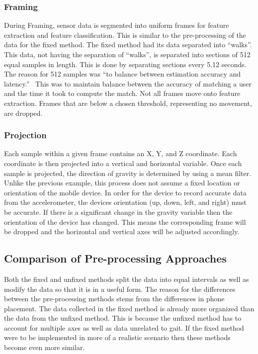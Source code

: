 \documentclass{sig-alternate}
\begin{document}
		
			
\subsubsection{Framing}{
 During Framing, sensor data is segmented into uniform frames for feature extraction and feature classification. This is similar to the pre-processing of the data for the fixed method. The fixed method had its data separated into ``walks''. This data, not having the separation of ``walks'', is separated into sections of 512 equal samples in length. This is done by separating sections every 5.12 seconds. The reason for 512 samples was ``to balance between estimation accuracy and latency.''~\cite{Lu:2014} This was to maintain balance between the accuracy of matching a user and the time it took to compute the match. Not all frames move onto feature extraction. Frames that are below a chosen threshold, representing no movement, are dropped. }
 			
\subsubsection{Projection}{
	Each sample within a given frame contains an X, Y, and Z coordinate. Each coordinate is then projected into a vertical and horizontal variable. Once each sample is projected, the direction of gravity is determined by using a mean filter. Unlike the previous example, this process does not assume a fixed location or orientation of the mobile device. In order for the device to record accurate data from the accelerometer, the devices orientation (up, down, left, and right) must be accurate. If there is a significant change in the gravity variable then the orientation of the device has changed. This means the corresponding frame will be dropped and the horizontal and vertical axes will be adjusted accordingly. 
}
\subsection{Comparison of Pre-processing Approaches}
	Both the fixed and unfixed methods split the data into equal intervals as well as modify the data so that it is in a useful form. The reason for the differences between the pre-processing methods stems from the differences in phone placement. The data collected in the fixed method is already more organized than the data from the unfixed method. This is because the unfixed method has to account for multiple axes as well as data unrelated to gait. If the fixed method were to be implemented in more of a realistic scenario then these methods become even more similar. 
\end{document}
